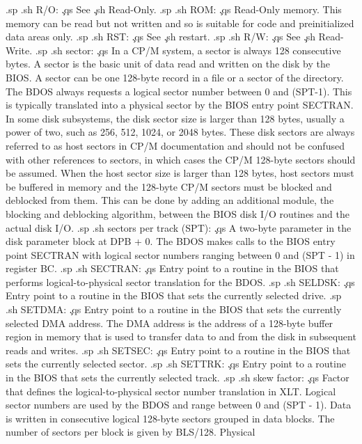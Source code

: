 .sp
.sh
R/O:  \c
.qs
See \c
.sh
Read-Only.
.sp
.sh
ROM:  \c
.qs
Read-Only memory.  This memory can be read but not written and so 
is suitable for code and preinitialized data areas only.
.sp
.sh
RST:  \c
.qs
See \c
.sh
restart.
.sp
.sh
R/W:  \c
.qs
See \c
.sh
Read-Write.
.sp
.sh
sector:  \c
.qs
In a CP/M system, a sector is always 128 consecutive bytes.  A 
sector is the basic unit of data read and written on the disk by 
the BIOS.  A sector can be one 128-byte record in a file or a 
sector of the directory.  The BDOS always requests a logical 
sector number between 0 and (SPT-1).  This is typically 
translated into a physical sector by the BIOS entry point 
SECTRAN.  In some disk subsystems, the disk sector size is larger 
than 128 bytes, usually a power of two, such as 256, 512, 1024, or 
2048 bytes.  These disk sectors are always referred to as host 
sectors in CP/M documentation and should not be confused with 
other references to sectors, in which cases the CP/M 128-byte 
sectors should be assumed.  When the host sector size is larger 
than 128 bytes, host sectors must be buffered in memory and the 
128-byte CP/M sectors must be blocked and deblocked from them.  
This can be done by adding an additional module, the blocking and 
deblocking algorithm, between the BIOS disk I/O routines and the 
actual disk I/O.
.sp
.sh
sectors per track (SPT):  \c
.qs
A two-byte parameter in the disk parameter block at DPB + 0.  The 
BDOS makes calls to the BIOS entry point SECTRAN with logical 
sector numbers ranging between 0 and (SPT - 1) in register BC.
.sp
.sh
SECTRAN:  \c
.qs
Entry point to a routine in the BIOS that performs
logical-to-physical sector translation for the BDOS.
.sp
.sh
SELDSK:  \c
.qs
Entry point to a routine in the BIOS that sets the currently 
selected drive.
.sp
.sh
SETDMA:  \c
.qs
Entry point to a routine in the BIOS that sets the currently 
selected DMA address.  The DMA address is the address of a
128-byte buffer region in memory that is used to transfer data to 
and from the disk in subsequent reads and writes.
.sp
.sh
SETSEC:  \c
.qs
Entry point to a routine in the BIOS that sets the currently 
selected sector.
.sp
.sh
SETTRK:  \c
.qs
Entry point to a routine in the BIOS that sets the currently 
selected track.
.sp
.sh
skew factor:  \c
.qs
Factor that defines the logical-to-physical sector number 
translation in XLT.  Logical sector numbers are used by the BDOS 
and range between 0 and (SPT - 1).  Data is written in 
consecutive logical 128-byte sectors grouped in data blocks.  The 
number of sectors per block is given by BLS/128.  Physical 
